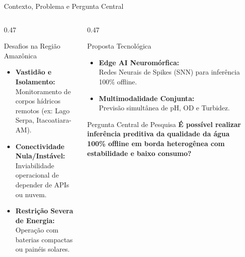 \documentclass[aspectratio=169,10pt]{beamer}
\begin{document}
\begin{frame}{Contexto, Problema e Pergunta Central}
  \begin{columns}[T,onlytextwidth]
    \begin{column}{0.47\linewidth}
      \begin{block}{Desafios na Região Amazônica}
        \footnotesize
        \begin{itemize}
          \item \textbf{Vastidão e Isolamento:}\\
          Monitoramento de corpos hídricos remotos (ex: Lago Serpa, Itacoatiara-AM).
          \vspace{0.08cm}
          \item \textbf{Conectividade Nula/Instável:}\\
          Inviabilidade operacional de depender de APIs ou nuvem.
          \vspace{0.08cm}
          \item \textbf{Restrição Severa de Energia:}\\
          Operação com baterias compactas ou painéis solares.
        \end{itemize}
      \end{block}
    \end{column}
    \hfill
    \begin{column}{0.47\linewidth}
      \begin{exampleblock}{Proposta Tecnológica}
        \footnotesize
        \begin{itemize}
          \item \textbf{Edge AI Neuromórfica:}\\
          Redes Neurais de Spikes (SNN) para inferência 100\% offline.
          \vspace{0.06cm}
          \item \textbf{Multimodalidade Conjunta:}\\
          Previsão simultânea de pH, OD e Turbidez.
        \end{itemize}
      \end{exampleblock}
      \vspace{0.10cm}
      \begin{alertblock}{Pergunta Central de Pesquisa}
        \fontsize{7.0pt}{8.8pt}\selectfont\centering
        \textbf{É possível realizar inferência preditiva da qualidade da água 100\% offline em borda heterogênea com estabilidade e baixo consumo?}
      \end{alertblock}
    \end{column}
  \end{columns}
\end{frame}
\end{document}

